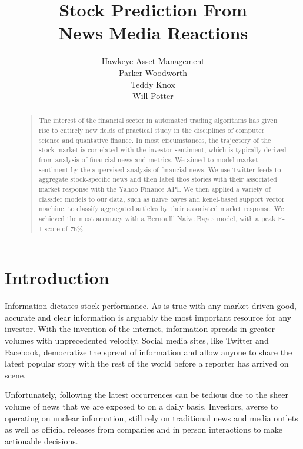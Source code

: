 \documentclass[letterpaper]{article}
\begin{document}
\title{Stock Prediction From\\ News Media Reactions}
\author{Hawkeye Asset Management\\
Parker Woodworth\\
Teddy Knox\\
Will Potter\\
}
\maketitle
\begin{abstract}
\begin{quote}
The interest of the financial sector in automated trading algorithms has given rise to entirely new fields of practical study in the disciplines of computer science and quantative finance. In most circumstances, the trajectory of the stock market is correlated with the investor sentiment, which is typically derived from analysis of financial news and metrics. We aimed to model market sentiment by the supervised analysis of financial news. We use Twitter feeds to aggregate stock-specific news and then label thos stories with their associated market response with the Yahoo Finance API. We then applied a variety of classfier models to our data, such as naïve bayes and kenel-based support vector machine, to classify aggregated articles by their associated market response. We achieved the most accuracy with a Bernoulli Naive Bayes model, with a peak F-1 score of 76\%.
\end{quote}
\end{abstract}

\section{Introduction}
\noindent Information dictates stock performance. As is true with any market driven good, accurate and clear information is arguably the most important resource for any investor. With the invention of the internet, information spreads in greater volumes with unprecedented velocity. Social media sites, like Twitter and Facebook, democratize the spread of information and allow anyone to share the latest popular story with the rest of the world before a reporter has arrived on scene. 

Unfortunately, following the latest occurrences can be tedious due to the sheer volume of news that we are exposed to on a daily basis. Investors, averse to operating on unclear information, still rely on traditional news and media outlets as well as official releases from companies and in person interactions to make actionable decisions.
\end{document}
